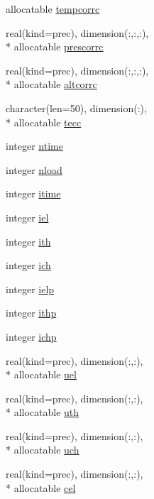 \begin{DoxyCompactItemize}
allocatable \hyperlink{classinputvar_a378a362979a22545cd843bbf687ca511}{tempcorrc}
\item 
real(kind=prec), dimension(\-:,\-:,\-:), \\*
allocatable \hyperlink{classinputvar_a4ad15e4562f67332a82dd70d6cfcb2fc}{prescorrc}
\item 
real(kind=prec), dimension(\-:,\-:,\-:), \\*
allocatable \hyperlink{classinputvar_a9fe000c19d0cd93b0e53d5d6b2cbc13f}{altcorrc}
\item 
character(len=50), dimension(\-:), \\*
allocatable \hyperlink{classinputvar_a2eb1c20cfae159c006e0fdc4b9ef0ef0}{tecc}
\item 
integer \hyperlink{classinputvar_a30d8dd7bcf1952df019939f8ad23b6e2}{ntime}
\item 
integer \hyperlink{classinputvar_ac924c0b7af6a3dbae99f1a60dc9242ab}{nload}
\item 
integer \hyperlink{classinputvar_a06f760a3ae10a8b9834a7e0d270d1d59}{itime}
\item 
integer \hyperlink{classinputvar_a6f9a3a8beea8f6e1aa8140bab654a48f}{iel}
\item 
integer \hyperlink{classinputvar_a4bba5fd8a8c399940c4b81e4da0cc9ce}{ith}
\item 
integer \hyperlink{classinputvar_a69cdcc78492d1a96e3f02ee2915f207d}{ich}
\item 
integer \hyperlink{classinputvar_a0190bc42c3dad91d811c585952ff55f4}{ielp}
\item 
integer \hyperlink{classinputvar_abb9734f3e3ee40c97881bd03881065c5}{ithp}
\item 
integer \hyperlink{classinputvar_af57151a30c510558682b98e1b72d844b}{ichp}
\item 
real(kind=prec), dimension(\-:,\-:), \\*
allocatable \hyperlink{classinputvar_a8540cf286b75c5a77a2c3f8e2623617a}{uel}
\item 
real(kind=prec), dimension(\-:,\-:), \\*
allocatable \hyperlink{classinputvar_abd9a09032c8d997c45cd49020fb78609}{uth}
\item 
real(kind=prec), dimension(\-:,\-:), \\*
allocatable \hyperlink{classinputvar_a53339aa6533c8e2333ec3eaa4a54796b}{uch}
\item 
real(kind=prec), dimension(\-:,\-:), \\*
allocatable \hyperlink{classinputvar_aae07469e8800dce385d02a73306d320c}{cel}

\end{DoxyCompactItemize}
